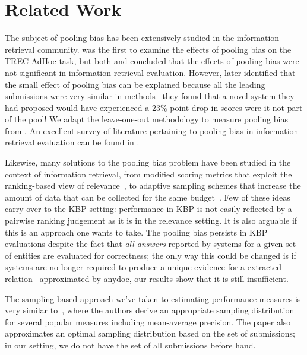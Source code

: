 \section{Related Work}
\label{sec:related}

The subject of pooling bias has been extensively studied in the information retrieval community.
\citep{zobel1998reliable} was the first to examine the effects of pooling bias on the TREC AdHoc task, but 
both \citet{zobel1998reliable} and \citet{voorhees199overview} concluded that the effects of pooling bias were not significant in information retrieval evaluation.
However, \citet{buckley2007bias} later identified that the small effect of pooling bias can be explained because all the leading submissions were very similar in methods-- they found that a novel system they had proposed would have experienced a 23\% point drop in scores were it not part of the pool!
We adapt the leave-one-out methodology to measure pooling bias from \citep{zobel1998reliable}.
An excellent survey of literature pertaining to pooling bias in information retrieval evaluation can be found in \citet{weber2010measurement}.

Likewise, many solutions to the pooling bias problem have been studied in the context of information retrieval,
  from modified scoring metrics that exploit the ranking-based view of relevance~\cite{buckley2004incomplete},
  to adaptive sampling schemes that increase the amount of data that can be collected for the same budget~\cite{}.
Few of these ideas carry over to the KBP setting: 
  performance in KBP is not easily reflected by a pairwise ranking judgement as it is in the relevance setting. It is also arguable if this is an approach one wants to take. 
  The pooling bias persists in KBP evaluations despite the fact that \textit{all answers} reported by systems for a given set of entities are evaluated for correctness; the only way this could be changed is if systems are no longer required to produce a unique evidence for a extracted relation-- approximated by anydoc, our results show that it is still insufficient.

The sampling based approach we've taken to estimating performance measures is very similar to~\cite{aslam2006statistical}, where the authors derive an appropriate sampling distribution for several popular measures including mean-average precision. The paper also approximates an optimal sampling distribution based on the set of submissions; in our setting, we do not have the set of all submissions before hand.

